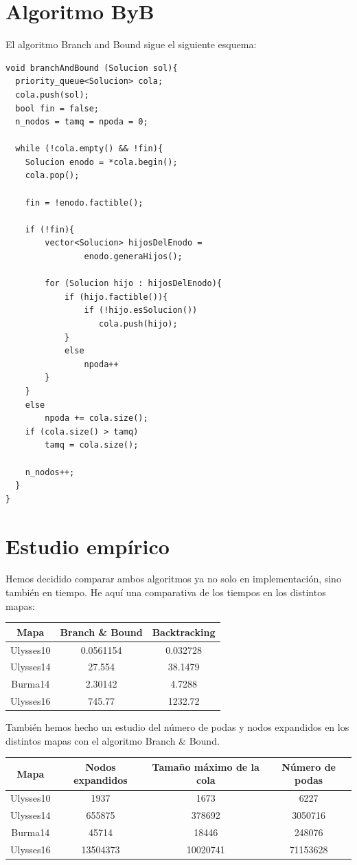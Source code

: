 \documentclass{article}
\begin{document}
	\section{Algoritmo ByB}
	El algoritmo Branch and Bound sigue el siguiente esquema:
	
	\begin{lstlisting}
void branchAndBound (Solucion sol){
  priority_queue<Solucion> cola;
  cola.push(sol);
  bool fin = false;
  n_nodos = tamq = npoda = 0;

  while (!cola.empty() && !fin){
	Solucion enodo = *cola.begin();
	cola.pop();

	fin = !enodo.factible();

	if (!fin){
		vector<Solucion> hijosDelEnodo = 
				enodo.generaHijos();

		for (Solucion hijo : hijosDelEnodo){
			if (hijo.factible()){
				if (!hijo.esSolucion())
				   cola.push(hijo);
			}
			else
				npoda++
		}
	}
	else
		npoda += cola.size();
	if (cola.size() > tamq)
		tamq = cola.size();
		
	n_nodos++;
  }
}
	\end{lstlisting}
	
	\section{Estudio empírico}
	Hemos decidido comparar ambos algoritmos ya no solo en implementación, sino también en tiempo. He aquí una comparativa de los tiempos en los distintos mapas:
	
	\begin{longtable}{|c|c|c|}
		\hline
		Mapa & Branch \& Bound & Backtracking \\ \hline
		Ulysses10 & 0.0561154 & 0.032728  \\ \hline
		Ulysses14 & 27.554 & 38.1479 \\ \hline
		Burma14 & 2.30142 & 4.7288\\ \hline
		Ulysses16 & 745.77 & 1232.72\\ \hline
	\end{longtable}

	También hemos hecho un estudio del número de podas y nodos expandidos en los distintos mapas con el algoritmo Branch \& Bound.
	
	\begin{longtable}{|c|c|c|c|}
		\hline
		Mapa & Nodos expandidos & Tamaño máximo de la cola & Número de podas \\ \hline
		Ulysses10 & 1937 & 1673 & 6227  \\ \hline
		Ulysses14 & 655875 & 378692 & 3050716 \\ \hline
		Burma14 & 45714 & 18446 & 248076 \\ \hline
		Ulysses16 & 13504373 & 10020741 & 71153628 \\ \hline
	\end{longtable}
\end{document}
